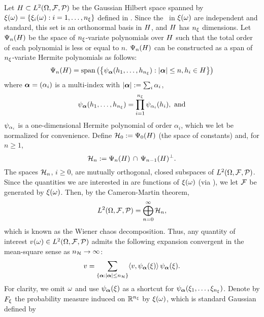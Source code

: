 Let $H \subset L^{2}(\Omega, \mathcal{F}, \mathcal{P})$ be the Gaussian Hilbert space \cite{janson1997} spanned by $\xi(\omega) = \{ \xi_i(\omega): i = 1, \dots, {n_\xi} \}$ defined in .
Since the \rvs\ in $\xi(\omega)$ are independent and standard, this set is an orthonormal basis in $H$, and $H$ has ${n_\xi}$ dimensions.
Let $\Psi_n(H)$ be the space of ${n_\xi}$-variate polynomials over $H$ such that the total order of each polynomial is less or equal to $n$.
$\Psi_n(H)$ can be constructed as a span of ${n_\xi}$-variate Hermite polynomials \cite{maitre2010, eldred2008} as follows:
\[
  \Psi_{n}(H) = \text{span}\left( \left\{ \psi_{{\boldsymbol \alpha}}(h_1, \dots, h_{n_\xi}): |{\boldsymbol \alpha}| \leq n, h_i \in H \right\} \right)
\]
where ${\boldsymbol \alpha} = (\alpha_i)$ is a multi-index with $|{\boldsymbol \alpha}| := \sum_i \alpha_i$,
\[
  \psi_{{\boldsymbol \alpha}}(h_1, \dots, h_{n_\xi}) = \prod_{i = 1}^{n_\xi} \psi_{\alpha_i}(h_i), \text{ and}
\]
$\psi_{\alpha_i}$ is a one-dimensional Hermite polynomial of order $\alpha_i$, which we let be normalized for convenience.
Define $\mathcal{H}_0 := \Psi_0(H)$ (the space of constants) and, for $n \geq 1$,
\[
  \mathcal{H}_n := \Psi_n(H) \, \cap \, \Psi_{n - 1}(H)^\perp.
\]
The spaces $\mathcal{H}_n$, $i \geq 0$, are mutually orthogonal, closed subspaces of $L^{2}(\Omega, \mathcal{F}, \mathcal{P})$.
Since the quantities we are interested in are functions of $\xi(\omega)$ (via ), we let $\mathcal{F}$ be generated by $\xi(\omega)$.
Then, by the Cameron-Martin theorem,
\[
  L^{2}(\Omega, \mathcal{F}, \mathcal{P}) = \bigoplus_{n = 0}^\infty \mathcal{H}_n,
\]
which is known as the Wiener chaos decomposition.
Thus, any quantity of interest $v(\omega) \in L^{2}(\Omega, \mathcal{F}, \mathcal{P})$ admits the following expansion convergent in the mean-square sense as ${n_{\mathcal{H}}} \to \infty$:
\begin{equation} \elab{wiener-chaos-decomposition}
  \w = \sum_{\{\multiindex: |\multiindex| \leq \ncorder\}} \innerProduct{\w, \polynomial_{\multiindex}(\z)} \, \polynomial_{\multiindex}(\z).
\end{equation}
For clarity, we omit $\omega$ and use $\psi_{{\boldsymbol \alpha}}(\xi)$ as a shortcut for $\psi_{{\boldsymbol \alpha}}(\xi_1, \dots, \xi_{n_\xi})$.
Denote by $F_\xi$ the probability measure induced on $\mathbb{R}^{n_\xi}$ by $\xi(\omega)$, which is standard Gaussian defined by
